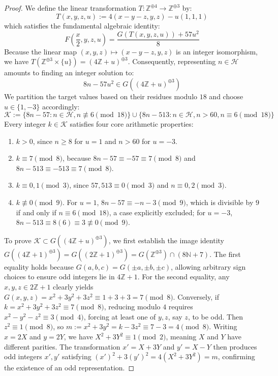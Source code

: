 \documentclass[11pt,letterpaper]{amsart} %
\theoremstyle{definition}
\begin{document}
\begin{proof}
We define the linear transformation $T : \mathbb{Z}^{\oplus 4} \to \mathbb{Z}^{\oplus 3}$ by:
$$T(x,y,z,u) := 4(x-y-z, y, z) - u(1,1,1)$$ %
which satisfies the fundamental algebraic identity:
$$F\left(\frac{x}{2},y,z,u\right) = \frac{G(T(x,y,z,u)) + 57u^2}{8}$$ %
Because the linear map $(x,y,z) \mapsto (x-y-z,y,z)$ is an integer isomorphism, we have $T(\mathbb{Z}^{\oplus 3} \times \{u\}) = (4\mathbb{Z}+u)^{\oplus 3}$. %
Consequently, representing $n \in \mathcal{H}$ amounts to finding an integer solution to:
$$8n - 57u^2 \in G((4\mathbb{Z}+u)^{\oplus 3})$$ %
We partition the target values based on their residues modulo $18$ and choose $u \in \{1,-3\}$ accordingly: %
$$\mathcal{K} := \{8n-57 : n \in \mathcal{H}, n \not\equiv 6 \pmod{18}\} \cup \{8n-513 : n \in \mathcal{H}, n > 60, n \equiv 6 \pmod{18}\}$$ %
Every integer $k \in \mathcal{K}$ satisfies four core arithmetic properties: %
\begin{enumerate}
    \item $k > 0$, since $n \ge 8$ for $u=1$ and $n > 60$ for $u=-3$. %
    \item $k \equiv 7 \pmod 8$, because $8n - 57 \equiv -57 \equiv 7 \pmod 8$ and $8n - 513 \equiv -513 \equiv 7 \pmod 8$. %
    \item $k \equiv 0,1 \pmod 3$, since $57, 513 \equiv 0 \pmod 3$ and $n \equiv 0,2 \pmod 3$. %
    \item $k \not\equiv 0 \pmod 9$. For $u=1$, $8n-57 \equiv -n-3 \pmod 9$, which is divisible by $9$ if and only if $n \equiv 6 \pmod{18}$, a case explicitly excluded; for $u=-3$, $8n-513 \equiv 8(6) \equiv 3 \not\equiv 0 \pmod 9$. %
\end{enumerate}

To prove $\mathcal{K} \subset G((4\mathbb{Z}+u)^{\oplus 3})$, we first establish the image identity $G((4\mathbb{Z}+1)^{\oplus 3}) = G((2\mathbb{Z}+1)^{\oplus 3}) = G(\mathbb{Z}^{\oplus 3}) \cap (8\mathbb{N}+7)$. %
The first equality holds because $G(a,b,c) = G(\pm a, \pm b, \pm c)$, allowing arbitrary sign choices to ensure odd integers lie in $4\mathbb{Z}+1$. %
For the second equality, any $x,y,z \in 2\mathbb{Z}+1$ clearly yields $G(x,y,z) = x^2+3y^2+3z^2 \equiv 1+3+3 = 7 \pmod 8$. %
Conversely, if $k = x^2+3y^2+3z^2 \equiv 7 \pmod 8$, reducing modulo $4$ requires $x^2-y^2-z^2 \equiv 3 \pmod 4$, forcing at least one of $y,z$, say $z$, to be odd. %
Then $z^2 \equiv 1 \pmod 8$, so $m := x^2+3y^2 = k - 3z^2 \equiv 7 - 3 = 4 \pmod 8$. %
Writing $x=2X$ and $y=2Y$, we have $X^2+3Y^2 \equiv 1 \pmod 2$, meaning $X$ and $Y$ have different parities. %
The transformation $x' = X+3Y$ and $y' = X-Y$ then produces odd integers $x',y'$ satisfying $(x')^2+3(y')^2 = 4(X^2+3Y^2) = m$, confirming the existence of an odd representation. %


\end{proof}
\end{document}
